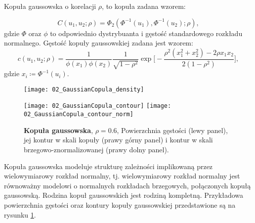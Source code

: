 \begin{df}
	Kopuła gaussowska o korelacji $\rho$, to kopuła zadana wzorem:
	
	$$ C(u_1, u_2; \rho) = \Phi_2(\Phi^{-1}(u_1), \Phi^{-1}(u_2);\rho),$$
	gdzie $\Phi$ oraz $\phi$ to odpowiednio dystrybuanta i gęstość standardowego rozkładu normalnego. Gęstość kopuły gaussowskiej zadana jest wzorem:
	$$ c(u_1, u_2; \rho) = \frac{1}{\phi(x_1)\phi(x_2)} \frac{1}{\sqrt{1-\rho^2}}\exp\bigg[-\frac{\rho^2(x_1^2+x_2^2) - 2\rho x_1 x_2}{2(1-\rho^2)}\bigg],$$
	gdzie $x_i\coloneqq \Phi^{-1}(u_i)$.
\end{df}
\begin{figure}[h]
	\centering
	\begin{minipage}{0.5\linewidth}
		\texttt{[image: 02\_GaussianCopula\_density]}
	\end{minipage}
	\begin{minipage}{0.45\linewidth}
		\texttt{[image: 02\_GaussianCopula\_contour]}
		\texttt{[image: 02\_GaussianCopula\_contour\_norm]}
	\end{minipage}
	\caption{\textbf{Kopuła gaussowska}, $\rho=0.6$, Powierzchnia gęstości (lewy panel), jej kontur w skali kopuły (prawy górny panel) i kontur w skali brzegowo-znormalizowanej (prawy dolny panel). \label{fig:gaussian_copula_density}}
\end{figure}

Kopuła gaussowska modeluje strukturę zależności implikowaną przez wielowymiarowy rozkład normalny, tj. wielowymiarowy rozkład normalny jest równoważny modelowi o normalnych rozkładach brzegowych, połączonych kopułą gaussowską. Rodzina kopuł gaussowskich jest rodziną kompletną. Przykładowa powierzchnia gęstości oraz kontury kopuły gaussowskiej przedstawione są na rysunku \ref{fig:gaussian_copula_density}.

